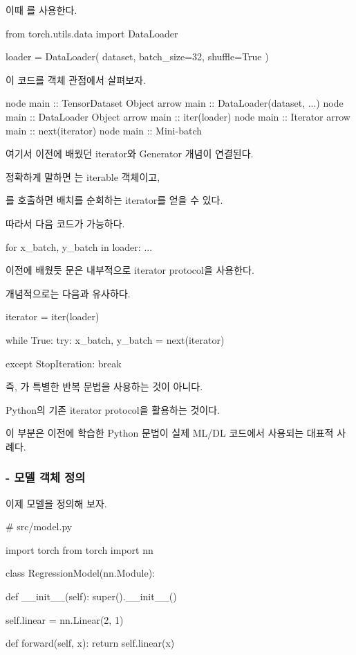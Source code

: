 이때 를 사용한다.

\begin{dhkcode}
from torch.utils.data import DataLoader

loader = DataLoader(
    dataset,
    batch_size=32,
    shuffle=True
)
\end{dhkcode}

이 코드를 객체 관점에서 살펴보자.

\begin{dhkbranch}[in=8]
node main :: TensorDataset Object
arrow main :: DataLoader(dataset, ...)
node main :: DataLoader Object
arrow main :: iter(loader)
node main :: Iterator
arrow main :: next(iterator)
node main :: Mini-batch
\end{dhkbranch}

여기서 이전에 배웠던 iterator와 Generator 개념이 연결된다.

정확하게 말하면 는 iterable 객체이고,

를 호출하면 배치를 순회하는 iterator를 얻을 수 있다.

따라서 다음 코드가 가능하다.

\begin{dhkcode}
for x_batch, y_batch in loader:
    ...
\end{dhkcode}

이전에 배웠듯 문은 내부적으로 iterator protocol을 사용한다.

개념적으로는 다음과 유사하다.

\begin{dhkcode}
iterator = iter(loader)

while True:
    try:
        x_batch, y_batch = next(iterator)

    except StopIteration:
        break
\end{dhkcode}

즉, 가 특별한 반복 문법을 사용하는 것이 아니다.

Python의 기존 iterator protocol을 활용하는 것이다.

이 부분은 이전에 학습한 Python 문법이 실제 ML/DL 코드에서 사용되는 대표적 사례다.

\subsubsection{ - 모델 객체 정의}

이제 모델을 정의해 보자.

\begin{dhkcode}
# src/model.py

import torch
from torch import nn

class RegressionModel(nn.Module):

    def __init__(self):
        super().__init__()

        self.linear = nn.Linear(2, 1)

    def forward(self, x):
        return self.linear(x)
\end{dhkcode}

